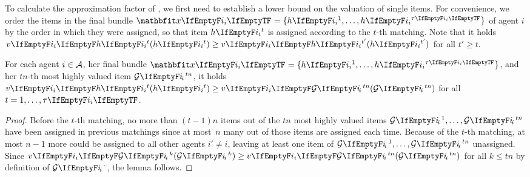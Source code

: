 To calculate the approximation factor of \SMatch, we first need to establish a lower bound on the valuation of single items.
For convenience, we order the items in the final bundle \(\alloc = \{\asgd{1}, \dots, \asgd{\alloclen}\}\) of agent \(i\) by the order in which they were assigned, so that item \(\asgd{t}\) is assigned according to the \(t\)-th matching.
Note that it holds \(\valuations[\asgd{t}] \ge \valuations[\asgd{t'}]\) for all \(t' \ge t\).
\begin{lemma}
	\label{lem:lower_bound_single_item}
	For each agent \(i \in \mathcal{A}\), her final bundle \(\alloc = \{\asgd{1}, \dots, \asgd{\alloclen}\}\), and her \(tn\)-th most highly valued item \(\goodsordered{tn}\), it holds \(\valuations[\asgd{t}] \ge \valuations[\goodsordered{tn}]\) for all \(t = 1, \dots, \alloclen\).
\end{lemma}
\begin{proof}
	Before the \(t\)-th matching, no more than \((t-1) n\) items out of the \(tn\) most highly valued items \(\goodsordered{1}, \dots, \goodsordered{tn}\) have been assigned in previous matchings since at most~\(n\) many out of those items are assigned each time.
	Because of the \(t\)-th matching, at most \(n-1\) more could be assigned to all other agents \(i' \neq i\), leaving at least one item of \(\goodsordered{1}, \dots, \goodsordered{tn}\) unassigned.
	Since \(\valuations[\goodsordered{k}] \ge \valuations[\goodsordered{tn}]\) for all \(k \le tn\) by definition of \(\goodsordered{\cdot}\), the lemma follows.
\end{proof}

